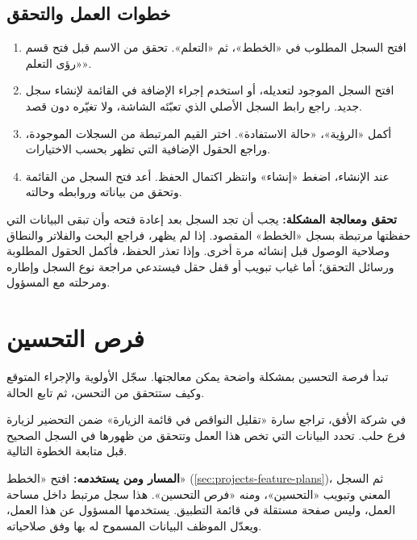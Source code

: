 \subsection{خطوات العمل والتحقق}
\begin{enumerate}
\item افتح السجل المطلوب في «الخطط»، ثم «التعلم». تحقق من الاسم قبل فتح قسم «رؤى التعلم».
\item افتح السجل الموجود لتعديله، أو استخدم إجراء الإضافة في القائمة لإنشاء سجل جديد. راجع رابط السجل الأصلي الذي تعبّئه الشاشة، ولا تغيّره دون قصد.
\item أكمل «الرؤية»، «حالة الاستفادة». اختر القيم المرتبطة من السجلات الموجودة، وراجع الحقول الإضافية التي تظهر بحسب الاختيارات.
\item عند الإنشاء، اضغط «إنشاء» وانتظر اكتمال الحفظ. أعد فتح السجل من القائمة وتحقق من بياناته وروابطه وحالته.
\end{enumerate}

\textbf{تحقق ومعالجة المشكلة:} يجب أن تجد السجل بعد إعادة فتحه وأن تبقى البيانات التي حفظتها مرتبطة بسجل «الخطط» المقصود. إذا لم يظهر، فراجع البحث والفلاتر والنطاق وصلاحية الوصول قبل إنشائه مرة أخرى. وإذا تعذر الحفظ، فأكمل الحقول المطلوبة ورسائل التحقق؛ أما غياب تبويب أو قفل حقل فيستدعي مراجعة نوع السجل وإطاره ومرحلته مع المسؤول.

\clearpage
\section{فرص التحسين}
\label{sec:projects-feature-planning-improvement-opportunities}

تبدأ فرصة التحسين بمشكلة واضحة يمكن معالجتها. سجّل الأولوية والإجراء المتوقع وكيف ستتحقق من التحسن، ثم تابع الحالة.

\begin{rcnote}
في شركة الأفق، تراجع سارة «تقليل النواقص في قائمة الزيارة» ضمن التحضير لزيارة فرع حلب. تحدد البيانات التي تخص هذا العمل وتتحقق من ظهورها في السجل الصحيح قبل متابعة الخطوة التالية.
\end{rcnote}

\textbf{المسار ومن يستخدمه:} افتح «الخطط» (\ref{sec:projects-feature-plans})، ثم السجل المعني وتبويب «التحسين»، ومنه «فرص التحسين». هذا سجل مرتبط داخل مساحة العمل، وليس صفحة مستقلة في قائمة التطبيق. يستخدمها المسؤول عن هذا العمل، ويعدّل الموظف البيانات المسموح له بها وفق صلاحياته.

